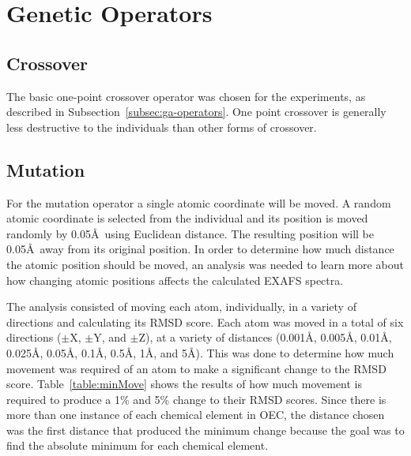 \section{Genetic Operators}
\label{sec:ga-operators}

\subsection{Crossover}

The basic one-point crossover operator was chosen for the experiments, as described in Subsection~\ref{subsec:ga-operators}. One point crossover is generally less destructive to the individuals than other forms of crossover. %

\subsection{Mutation}
\label{subsec:mutation}

For the mutation operator a single atomic coordinate will be moved. A random atomic coordinate is selected from the individual and its position is moved randomly by 0.05\AA\  using Euclidean distance. The resulting position will be 0.05\AA\ away from its original position. In order to determine how much distance the atomic position should be moved, an analysis was needed to learn more about how changing atomic positions affects the calculated EXAFS spectra.

The analysis consisted of moving each atom, individually, in a variety of directions and calculating its RMSD score. Each atom was moved in a total of six directions ($\pm$X, $\pm$Y, and $\pm$Z), at a variety of distances (0.001\AA, 0.005\AA, 0.01\AA, 0.025\AA, 0.05\AA, 0.1\AA, 0.5\AA, 1\AA, and 5\AA). This was done to determine how much movement was required of an atom to make a significant change to the RMSD score. Table~\ref{table:minMove} shows the results of how much movement is required to produce a 1\% and 5\% change to their RMSD scores. Since there is more than one instance of each chemical element in OEC, the distance chosen was the first distance that produced the minimum change because the goal was to find the absolute minimum for each chemical element.

